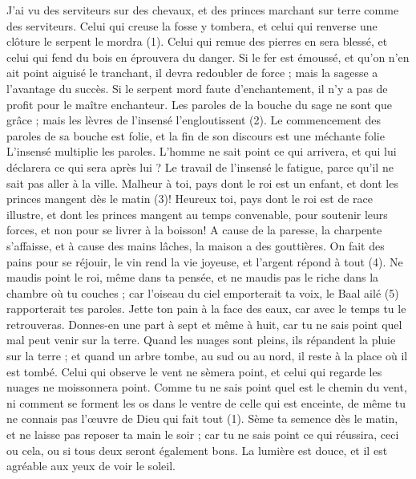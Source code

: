 \begin{multicols}{2}
J'ai vu des serviteurs sur des chevaux, et des princes marchant sur terre comme des serviteurs.
Celui qui creuse la fosse y tombera, et celui qui renverse une clôture le serpent le mordra\FTNT{} (1).
Celui qui remue des pierres en sera blessé, et celui qui fend du bois en éprouvera du danger.
Si le fer est émoussé, et qu'on n'en ait point aiguisé le tranchant, il devra redoubler de force ; mais la sagesse a l’avantage du succès.
Si le serpent mord faute d’enchantement, il n’y a pas de profit pour le maître enchanteur.
Les paroles de la bouche du sage ne sont que grâce ; mais les lèvres de l’insensé l’engloutissent\FTNT{} (2).
Le commencement des paroles de sa bouche est folie, et la fin de son discours est une méchante folie
L’insensé multiplie les paroles. L'homme ne sait point ce qui arrivera, et qui lui déclarera ce qui sera après lui ?
Le travail de l’insensé le fatigue, parce qu’il ne sait pas aller à la ville.
Malheur à toi, pays dont le roi est un enfant, et dont les princes mangent dès le matin\FTNT{} (3)!
Heureux toi, pays dont le roi est de race illustre, et dont les princes mangent au temps convenable, pour soutenir leurs forces, et non pour se livrer à la boisson!
A cause de la paresse, la charpente s'affaisse, et à cause des mains lâches, la maison a des gouttières.
On fait des pains pour se réjouir, le vin rend la vie joyeuse, et l'argent répond à tout\FTNT{} (4).
Ne maudis point le roi, même dans ta pensée, et ne maudis pas le riche dans la chambre où tu couches ; car l’oiseau du ciel emporterait ta voix, le Baal ailé (5) rapporterait tes paroles.
\VerseOne{}Jette ton pain à la face des eaux, car avec le temps tu le retrouveras.
Donnes-en une part à sept et même à huit, car tu ne sais point quel mal peut venir sur la terre.
Quand les nuages sont pleins, ils répandent la pluie sur la terre ; et quand un arbre tombe, au sud ou au nord, il reste à la place où il est tombé.
Celui qui observe le vent ne sèmera point, et celui qui regarde les nuages ne moissonnera point.
Comme tu ne sais point quel est le chemin du vent, ni comment se forment les os dans le ventre de celle qui est enceinte, de même tu ne connais pas l'œuvre de Dieu qui fait tout\FTNT{} (1).
Sème ta semence dès le matin, et ne laisse pas reposer ta main le soir ; car tu ne sais point ce qui réussira, ceci ou cela, ou si tous deux seront également bons.
La lumière est douce, et il est agréable aux yeux de voir le soleil.

\end{multicols}

